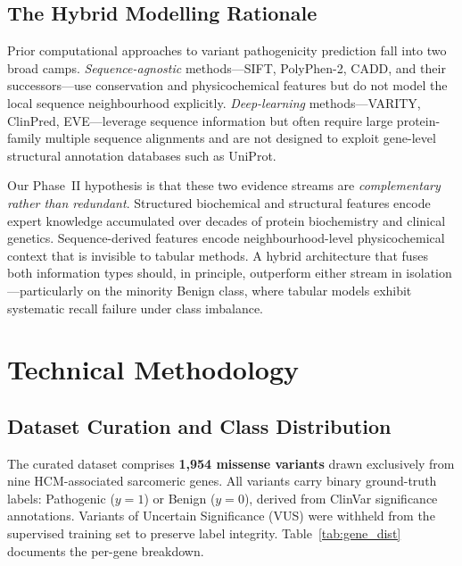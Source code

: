 \documentclass[12pt,a4paper]{article}
\begin{document}
\subsection{The Hybrid Modelling Rationale}
\label{subsec:hybrid}

Prior computational approaches to variant pathogenicity prediction fall into
two broad camps. \emph{Sequence-agnostic} methods—SIFT, PolyPhen-2, CADD,
and their successors—use conservation and physicochemical features but do
not model the local sequence neighbourhood explicitly. \emph{Deep-learning}
methods—VARITY, ClinPred, EVE—leverage sequence information but often
require large protein-family multiple sequence alignments and are not
designed to exploit gene-level structural annotation databases such as
UniProt.

Our Phase~II hypothesis is that these two evidence streams are
\emph{complementary rather than redundant}. Structured biochemical and
structural features encode expert knowledge accumulated over decades of
protein biochemistry and clinical genetics. Sequence-derived features
encode neighbourhood-level physicochemical context that is invisible to
tabular methods. A hybrid architecture that fuses both information types
should, in principle, outperform either stream in isolation—particularly on
the minority Benign class, where tabular models exhibit systematic recall
failure under class imbalance.

\section{Technical Methodology}
\label{sec:methods}

\subsection{Dataset Curation and Class Distribution}
\label{subsec:data}

The curated dataset comprises \textbf{1,954 missense variants} drawn
exclusively from nine HCM-associated sarcomeric genes. All variants carry
binary ground-truth labels: Pathogenic ($y=1$) or Benign ($y=0$), derived
from ClinVar significance annotations. Variants of Uncertain Significance
(VUS) were withheld from the supervised training set to preserve label
integrity. Table~\ref{tab:gene_dist} documents the per-gene breakdown.
\end{document}
